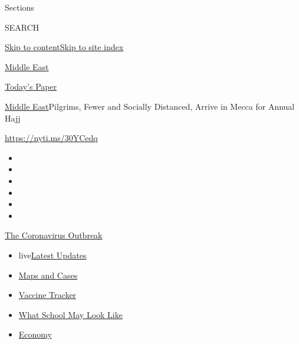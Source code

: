 Sections

SEARCH

\protect\hyperlink{site-content}{Skip to
content}\protect\hyperlink{site-index}{Skip to site index}

\href{https://www.nytimes3xbfgragh.onion/section/world/middleeast}{Middle
East}

\href{https://myaccount.nytimes3xbfgragh.onion/auth/login?response_type=cookie\&client_id=vi}{}

\href{https://www.nytimes3xbfgragh.onion/section/todayspaper}{Today's
Paper}

\href{/section/world/middleeast}{Middle East}\textbar{}Pilgrims, Fewer
and Socially Distanced, Arrive in Mecca for Annual Hajj

\url{https://nyti.ms/30YCedq}

\begin{itemize}
\item
\item
\item
\item
\item
\item
\end{itemize}

\href{https://www.nytimes3xbfgragh.onion/news-event/coronavirus?action=click\&pgtype=Article\&state=default\&region=TOP_BANNER\&context=storylines_menu}{The
Coronavirus Outbreak}

\begin{itemize}
\tightlist
\item
  live\href{https://www.nytimes3xbfgragh.onion/2020/08/01/world/coronavirus-covid-19.html?action=click\&pgtype=Article\&state=default\&region=TOP_BANNER\&context=storylines_menu}{Latest
  Updates}
\item
  \href{https://www.nytimes3xbfgragh.onion/interactive/2020/us/coronavirus-us-cases.html?action=click\&pgtype=Article\&state=default\&region=TOP_BANNER\&context=storylines_menu}{Maps
  and Cases}
\item
  \href{https://www.nytimes3xbfgragh.onion/interactive/2020/science/coronavirus-vaccine-tracker.html?action=click\&pgtype=Article\&state=default\&region=TOP_BANNER\&context=storylines_menu}{Vaccine
  Tracker}
\item
  \href{https://www.nytimes3xbfgragh.onion/interactive/2020/07/29/us/schools-reopening-coronavirus.html?action=click\&pgtype=Article\&state=default\&region=TOP_BANNER\&context=storylines_menu}{What
  School May Look Like}
\item
  \href{https://www.nytimes3xbfgragh.onion/live/2020/07/31/business/stock-market-today-coronavirus?action=click\&pgtype=Article\&state=default\&region=TOP_BANNER\&context=storylines_menu}{Economy}
\end{itemize}

